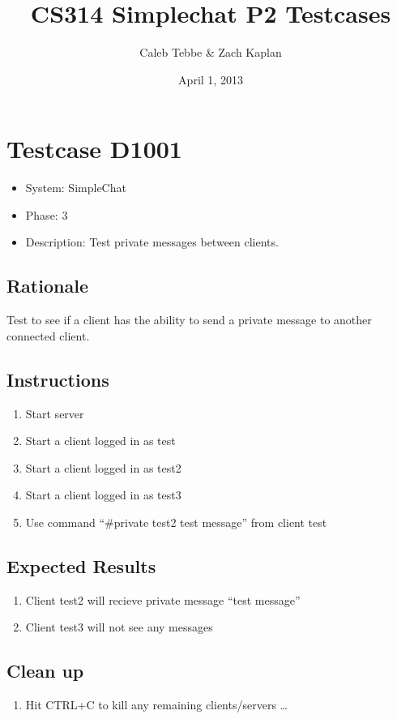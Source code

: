 \documentclass[12pt]{article}
\title{CS314 Simplechat P2 Testcases}
\author{Caleb Tebbe \& Zach Kaplan}
\date{April 1, 2013}
\begin{document}
\maketitle


\section{Testcase D1001}
\begin{itemize}
\item System: SimpleChat
\item Phase: 3
\item Description: Test private messages between clients.
\end{itemize}

\subsection*{Rationale}
Test to see if a client has the ability to send a private message to another connected client.


\subsection*{Instructions}
\begin{enumerate}
\item Start server
\item Start a client logged in as test
\item Start a client logged in as test2
\item Start a client logged in as test3
\item Use command ``\#private test2 test message'' from client test
\end{enumerate}


\subsection*{Expected Results}
\begin{enumerate}
\item Client test2 will recieve private message ``test message''
\item Client test3 will not see any messages
\end{enumerate}


\subsection*{Clean up}
\begin{enumerate}
\item Hit CTRL+C to kill any remaining clients/servers \dots
\end{enumerate}

\end{document}
